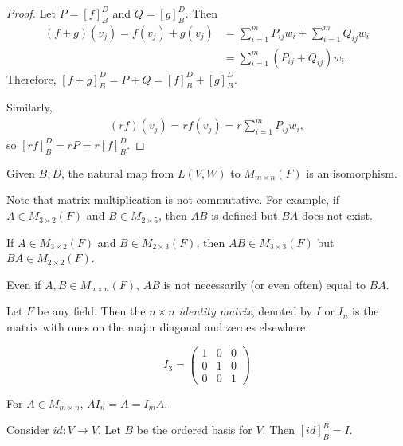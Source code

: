 \begin{proof}
    Let $P = [f]_B^D$ and $Q = [g]_B^D$. Then
    \begin{align}
        (f + g)(v_j) = f(v_j) + g(v_j) &= \sum_{i=1}^{m}P_{ij}w_i + \sum_{i = 1}^{m}Q_{ij}w_i \\
        &= \sum_{i=1}^{m}\left(P_{ij} + Q_{ij}\right)w_i.
    \end{align}
    Therefore, $[f + g]_B^D = P + Q = [f]_B^D + [g]_B^D$.

    Similarly,
    \begin{align*}
        (rf)(v_j) = rf(v_j) = r\sum_{i=1}^{m}P_{ij}w_i,
    \end{align*}
    so $[rf]_B^D = rP = r[f]_B^D$.
\end{proof}

\begin{rmk}
    Given $B, D$, the natural map from $L(V, W)$ to $M_{m\times n}(F)$ is an isomorphism.
\end{rmk}

\begin{rmk}
    Note that matrix multiplication is not commutative. For example, if $A \in M_{3 \times 2}(F)$ and $B \in M_{2 \times 5}$, then $AB$ is defined but $BA$ does not exist.

    If $A \in M_{3 \times 2}(F)$ and $B \in M_{2 \times 3}(F)$, then $AB \in M_{3 \times 3}(F)$ but $BA \in M_{2 \times 2}(F)$.

    Even if $A, B \in M_{n \times n}(F)$, $AB$ is not necessarily (or even often) equal to $BA$.
\end{rmk}

\begin{defn}
    Let $F$ be any field. Then the \emph{$n \times n$ identity matrix}, denoted by $I$ or $I_n$ is the matrix with ones on the major diagonal and zeroes elsewhere.
\end{defn}

\begin{exmp}
    \[I_3 = \begin{pmatrix}
        1 & 0 & 0 \\ 0 & 1 & 0 \\ 0 & 0 & 1
    \end{pmatrix}\]
\end{exmp}

\begin{prop}
    For $A \in M_{m \times n}$, $AI_n = A = I_mA$.
\end{prop}

\begin{rmk}
    Consider $id: V \to V$. Let $B$ be the ordered basis for $V$. Then $[id]_B^B = I$.
\end{rmk}

